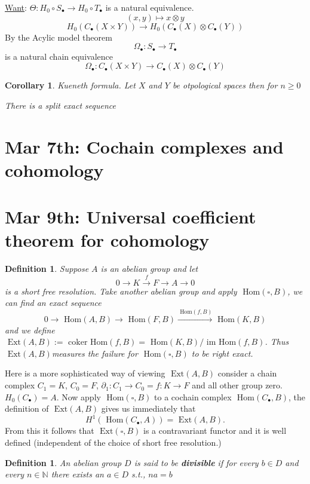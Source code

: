 \documentclass[11pt]{article}
\newtheorem{cor}[thm]{Corollary}
\newtheorem{dfn}[thm]{Definition}
\renewcommand{\hom}{\text{ Hom}}
\newcommand{\im}{\text{ im}}
\newcommand{\coker}{\text{ coker}}
\newcommand{\ext}{\text{ Ext}}
\newcommand{\pd}{\partial}
\newcommand{\lrta}{\longrightarrow}
\begin{document}
\underline{Want}: 
$\Theta:H_0\circ S_\bullet\lrta H_0\circ T_\bullet$ is a natural equivalence.
$$
(x,y)\mapsto x\otimes y
$$
$$
H_0(C_\bullet(X\times Y))\lrta H_0(C_\bullet(X)\otimes C_\bullet (Y))
$$
By the Acylic model theorem
$$
\Omega_\bullet: S_\bullet\lrta T_\bullet
$$
 is a natural chain equivalence
 $$
\Omega_\bullet:C_\bullet(X\times Y)\lrta C_\bullet(X)\otimes C_\bullet(Y)
 $$

\begin{cor}
Kueneth formula.
Let $X$ and $Y$  be otpological spaces then for $n\geq0$

There is a split exact sequence
\end{cor}
\section{Mar 7th: Cochain complexes and cohomology}

\section{Mar 9th: Universal coefficient theorem for cohomology}
\begin{dfn}
Suppose $A$ is an abelian group and let 
$$
0\lrta K \overset{f}{\lrta} F\lrta A\lrta 0
$$
is a short free resolution. Take another abelian group and apply $\hom(\square, B)$, we can find an exact sequence
$$
0\lrta \hom(A, B)\lrta \hom(F,B) \overset{\hom(f,B)}{\lrta} \hom(K,B)
$$
and we define $\ext(A,B):=\coker\hom(f,B)=\hom (K,B)/\im \hom(f,B)$. Thus $\ext (A,B) $measures the failure for $\hom(\square, B)$ to be right exact.
\end{dfn}
Here is a more sophisticated way of viewing $\ext (A,B)$ consider a chain complex $C_1=K$, $C_0=F$, $\pd_1:C_1\lrta C_0=f: K\lrta F$ and all other group zero. $H_0(C_\bullet)=A$. Now apply $\hom(\square, B)$ to a cochain complex $\hom(C_\bullet ,B)$, the definition of $\ext (A,B)$ gives us immediately that
$$
H^1(\hom(C_\bullet,A))=\ext(A,B).
$$
From this it follows that $\ext(\square, B)$ is a contravariant functor and it is well defined (independent of the choice of short free resolution.)
\begin{dfn}
An abelian group $D$ is said to be \textbf{divisible} if  for every $b\in D$ and every $n\in \mathbb{N}$ there exists an $a\in D$ s.t., $na=b$
\end{dfn}
\end{document}
